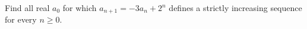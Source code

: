 Find all real $a_0$ for which $a_{n+1}=-3a_n+2^n$ defines a strictly increasing sequence for every $n\ge0$.
